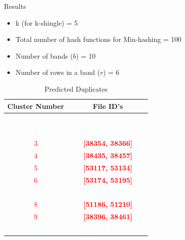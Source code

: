 \documentclass[15pt,t]{beamer}
\begin{document}
\begin{frame}{Results}
\begin{itemize}
\item [$\square$] k (for k-shingle) = 5
\item [$\square$] Total number of hash functions for Min-hashing = 100
\item [$\square$] Number of bands ($b$) = 10
\item [$\square$] Number of rows in a band  ($r$) = 6
\end{itemize}
\pause
\begin{table}[H] 
\label{table2}
\begin{center}
\caption{Predicted Duplicates}
\begin{tabular}{|c|c|}
\hline
Cluster Number & File ID's \\
\hline
\textcolor{azure}{1}             & \textcolor{azure}{\textbf{[38227, 38330]}} \\
\textcolor{azure}{2}             & \textcolor{azure}{\textbf{[37917, 37950]}} \\
\textcolor{red}{3}               & \textcolor{red}{\textbf{[38354, 38366]}} \\
\textcolor{red}{4}               & \textcolor{red}{\textbf{[38435, 38457]}} \\
\textcolor{red}{5}               & \textcolor{red}{\textbf{[53117, 53134]}} \\
\textcolor{red}{6}               & \textcolor{red}{\textbf{[53174, 53195]}}\\\
\textcolor{azure}{7 }            & \textcolor{azure}{\textbf{[38438, 38442, 38458]}} \\
\textcolor{red}{8}               & \textcolor{red}{\textbf{[51186, 51210]}} \\
\textcolor{red}{9}               & \textcolor{red}{\textbf{[38396, 38461]}} \\
\textcolor{azure}{10}            & \textcolor{azure}{\textbf{[53072, 53178]}} \\
\hline
\end{tabular}
\end{center}
\end{table}
\end{frame}

\end{document}
